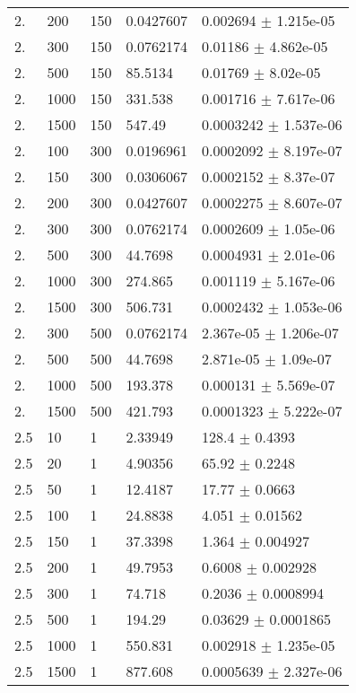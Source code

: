 \begin{longtable}{lllll}
  2. &   200 &   150 & 0.0427607 & 0.002694 $\pm$ 1.215e-05 \\
  2. &   300 &   150 & 0.0762174 &  0.01186 $\pm$ 4.862e-05 \\
  2. &   500 &   150 &  85.5134 &  0.01769 $\pm$ 8.02e-05 \\
  2. &  1000 &   150 &  331.538 & 0.001716 $\pm$ 7.617e-06 \\
  2. &  1500 &   150 &   547.49 & 0.0003242 $\pm$ 1.537e-06 \\
  2. &   100 &   300 & 0.0196961 & 0.0002092 $\pm$ 8.197e-07 \\
  2. &   150 &   300 & 0.0306067 & 0.0002152 $\pm$ 8.37e-07 \\
  2. &   200 &   300 & 0.0427607 & 0.0002275 $\pm$ 8.607e-07 \\
  2. &   300 &   300 & 0.0762174 & 0.0002609 $\pm$ 1.05e-06 \\
  2. &   500 &   300 &  44.7698 & 0.0004931 $\pm$ 2.01e-06 \\
  2. &  1000 &   300 &  274.865 & 0.001119 $\pm$ 5.167e-06 \\
  2. &  1500 &   300 &  506.731 & 0.0002432 $\pm$ 1.053e-06 \\
  2. &   300 &   500 & 0.0762174 & 2.367e-05 $\pm$ 1.206e-07 \\
  2. &   500 &   500 &  44.7698 & 2.871e-05 $\pm$ 1.09e-07 \\
  2. &  1000 &   500 &  193.378 & 0.000131 $\pm$ 5.569e-07 \\
  2. &  1500 &   500 &  421.793 & 0.0001323 $\pm$ 5.222e-07 \\
 2.5 &    10 &     1 &  2.33949 &    128.4 $\pm$   0.4393 \\
 2.5 &    20 &     1 &  4.90356 &    65.92 $\pm$   0.2248 \\
 2.5 &    50 &     1 &  12.4187 &    17.77 $\pm$   0.0663 \\
 2.5 &   100 &     1 &  24.8838 &    4.051 $\pm$  0.01562 \\
 2.5 &   150 &     1 &  37.3398 &    1.364 $\pm$ 0.004927 \\
 2.5 &   200 &     1 &  49.7953 &   0.6008 $\pm$ 0.002928 \\
 2.5 &   300 &     1 &   74.718 &   0.2036 $\pm$ 0.0008994 \\
 2.5 &   500 &     1 &   194.29 &  0.03629 $\pm$ 0.0001865 \\
 2.5 &  1000 &     1 &  550.831 & 0.002918 $\pm$ 1.235e-05 \\
 2.5 &  1500 &     1 &  877.608 & 0.0005639 $\pm$ 2.327e-06 \\

\end{longtable}
